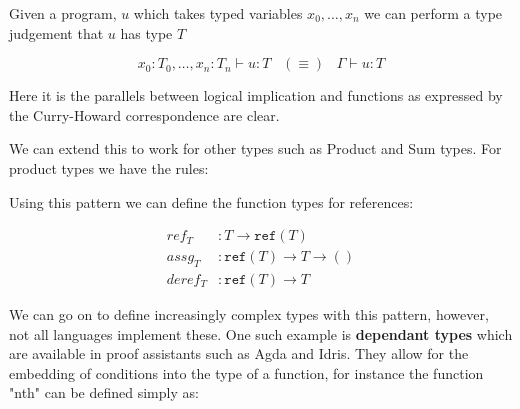 \documentclass{article}
\begin{document}
Given a program, $u$ which takes typed variables $x_0,\ldots,x_n$ we can perform a type judgement that $u$ has type $T$

\[
    x_0:T_0,\ldots,x_n:T_n \vdash u:T \;\;\; (\equiv) \;\;\; \Gamma \vdash u:T
\]

\begin{center}
   \begin{prooftree}
   \end{prooftree} 
   \begin{prooftree}
   \end{prooftree}
\end{center}

Here it is the parallels between logical implication and functions as expressed by the Curry-Howard correspondence are clear.

We can extend this to work for other types such as Product and Sum types. For product types we have the rules:

\begin{center}
   \begin{prooftree}
   \end{prooftree} 
   \begin{prooftree}
   \end{prooftree}
\end{center}

Using this pattern we can define the function types for references:

\begin{align*}
    ref_T &: T \rightarrow \texttt{ref}(T) \\
    assg_T &: \texttt{ref}(T) \rightarrow T \rightarrow ()\\
    deref_T &: \texttt{ref}(T) \rightarrow T
\end{align*}

We can go on to define increasingly complex types with this pattern, however, not all languages implement these. 
One such example is \textbf{dependant types} which are available in proof assistants such as Agda and Idris. They allow for the embedding of conditions into the type of a function, for instance the function "nth" can be defined simply as:
\end{document}
